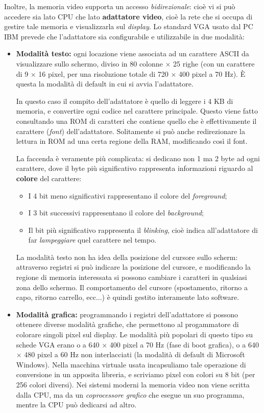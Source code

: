 \documentclass[a4paper,11pt]{article}
\begin{document}
Inoltre, la memoria video supporta un accesso \textit{bidirezionale}: cioè vi si può accedere sia lato CPU che lato \textbf{adattatore video}, cioè la rete che si occupa di gestire tale memoria e visualizzarla sul \textit{display}.
Lo standard VGA usato dal PC IBM prevede che l'adattatore sia configurabile e utilizzabile in due modalità:
\begin{itemize}
	\item \textbf{Modalità testo:} ogni locazione viene associata ad un carattere ASCII da visualizzare sullo schermo, diviso in 80 colonne $\times$ 25 righe (con un carattere di 9 $\times$ 16 pixel, per una risoluzione totale di 720 $\times$ 400 pixel a 70 Hz). È questa la modalità di default in cui si avvia l'adattatore.

		In questo caso il compito dell'adattatore è quello di leggere i 4 KB di memoria, e convertire ogni codice nel carattere principale.
		Questo viene fatto consultando una ROM di caratteri che contiene quello che è effettivamente il carattere (\textit{font}) dell'adattatore.
		Solitamente si può anche redirezionare la lettura in ROM ad una certa regione della RAM, modificando così il font.

		La faccenda è veramente più complicata: si dedicano non 1 ma 2 byte ad ogni carattere, dove il byte più significativo rappresenta informazioni riguardo al \textbf{colore} del carattere:
		\begin{itemize}
			\item I 4 bit meno significativi rappresentano il colore del \textit{foreground};
			\item I 3 bit successivi rappresentano il colore del \textit{background};
				\item Il bit più significativo rappresenta il \textit{blinking}, cioè indica all'adattatore di far \textit{lampeggiare} quel carattere nel tempo.
		\end{itemize}

		La modalità testo non ha idea della posizione del cursore sullo scherm: attraverso registri si può indicare la posizione del cursore, e modificando la regione di memoria interessata si possono cambiare i caratteri in qualsiasi zona dello schermo.
		Il comportamento del cursore (spostamento, ritorno a capo, ritorno carrello, ecc...) è quindi gestito interamente lato software.
	\item \textbf{Modalità grafica:} programmando i registri dell'adattatore si possono ottenere diverse modalità grafiche, che permettono al progammatore di colorare singoli pixel sul display.
		Le modalità più popolari di questo tipo su schede VGA erano o a 640 $\times$ 400 pixel a 70 Hz (fase di boot grafica), o a 640 $\times$ 480 pixel a 60 Hz non interlacciati (la modalità di default di Microsoft Windows). 
	Nella macchina virtuale usata incapsuliamo tale operazione di conversione in un apposita libreria, e scriviamo pixel con colori su 8 bit (per 256 colori diversi).
	Nei sistemi moderni la memoria video non viene scritta dalla CPU, ma da un \textit{coprocessore grafico} che esegue un suo programma, mentre la CPU può dedicarsi ad altro.	
\end{itemize}
\end{document}
